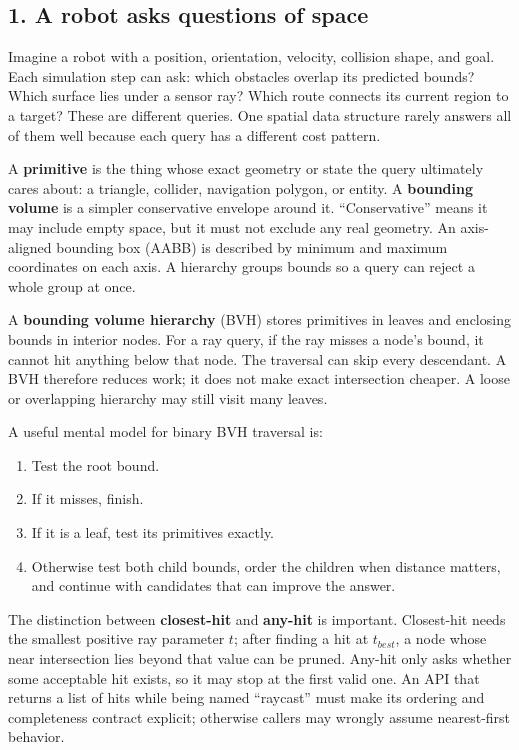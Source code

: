 \subsection{1. A robot asks questions of space}\label{05-engine-i-ch008-a-robot-asks-questions-of-space}

\hypertarget{05-engine-i-ch008-a-robot-asks-questions-of-space}{}

Imagine a robot with a position, orientation, velocity, collision shape, and goal. Each simulation step can ask: which obstacles overlap its predicted bounds? Which surface lies under a sensor ray? Which route connects its current region to a target? These are different queries. One spatial data structure rarely answers all of them well because each query has a different cost pattern.

A \textbf{primitive} is the thing whose exact geometry or state the query ultimately cares about: a triangle, collider, navigation polygon, or entity. A \textbf{bounding volume} is a simpler conservative envelope around it. ``Conservative'' means it may include empty space, but it must not exclude any real geometry. An axis-aligned bounding box (AABB) is described by minimum and maximum coordinates on each axis. A hierarchy groups bounds so a query can reject a whole group at once.

A \textbf{bounding volume hierarchy} (BVH) stores primitives in leaves and enclosing bounds in interior nodes. For a ray query, if the ray misses a node's bound, it cannot hit anything below that node. The traversal can skip every descendant. A BVH therefore reduces work; it does not make exact intersection cheaper. A loose or overlapping hierarchy may still visit many leaves.

A useful mental model for binary BVH traversal is:

\begin{enumerate}
\def\labelenumi{\arabic{enumi}.}
\tightlist
\item
  Test the root bound.
\item
  If it misses, finish.
\item
  If it is a leaf, test its primitives exactly.
\item
  Otherwise test both child bounds, order the children when distance matters, and continue with candidates that can improve the answer.
\end{enumerate}

The distinction between \textbf{closest-hit} and \textbf{any-hit} is important. Closest-hit needs the smallest positive ray parameter \(t\); after finding a hit at \(t_{best}\), a node whose near intersection lies beyond that value can be pruned. Any-hit only asks whether some acceptable hit exists, so it may stop at the first valid one. An API that returns a list of hits while being named ``raycast'' must make its ordering and completeness contract explicit; otherwise callers may wrongly assume nearest-first behavior.


